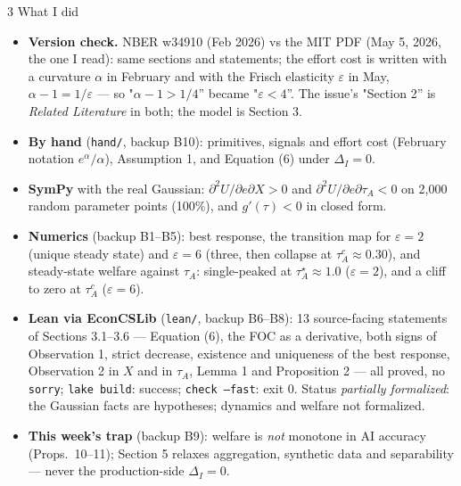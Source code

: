 \documentclass[aspectratio=169,11pt]{beamer}
\begin{document}
\begin{frame}{3 \textperiodcentered{} What I did}
  \footnotesize
  \begin{itemize}
    \item \textbf{Version check.} NBER w34910 (Feb 2026) vs the MIT PDF (May 5, 2026, the one I read): same
      sections and statements; the effort cost is written with a curvature $\alpha$ in February and with the
      Frisch elasticity $\varepsilon$ in May, $\alpha-1=1/\varepsilon$ --- so "$\alpha-1>1/4$'' became "$\varepsilon<4$''.
      The issue's "Section 2'' is \emph{Related Literature} in both; the model is Section 3.
    \item \textbf{By hand} (\texttt{hand/}, backup B10): primitives, signals and effort cost (February notation
      $e^\alpha/\alpha$), Assumption 1, and Equation (6) under $\Delta_I=0$.
    \item \textbf{SymPy} with the real Gaussian: $\partial^2U/\partial e\partial X>0$ and $\partial^2U/\partial e\partial\tau_A<0$
      on 2{,}000 random parameter points (100\%), and $g'(\tau)<0$ in closed form.
    \item \textbf{Numerics} (backup B1--B5): best response, the transition map for $\varepsilon=2$ (unique steady
      state) and $\varepsilon=6$ (three, then collapse at $\tau_A^c\approx 0.30$), and steady-state welfare
      against $\tau_A$: single-peaked at $\tau_A^\star\approx 1.0$ ($\varepsilon=2$), and a cliff to zero at
      $\tau_A^c$ ($\varepsilon=6$).
    \item \textbf{Lean via EconCSLib} (\texttt{lean/}, backup B6--B8): 13 source-facing statements of Sections
      3.1--3.6 --- Equation (6), the FOC as a derivative, both signs of Observation 1, strict decrease,
      existence and uniqueness of the best response, Observation 2 in $X$ and in $\tau_A$, Lemma 1 and
      Proposition 2 --- all proved, no \texttt{sorry}; \texttt{lake build}: success; \texttt{check --fast}: exit 0.
      Status \emph{partially formalized}: the Gaussian facts are hypotheses; dynamics and welfare not formalized.
    \item \textbf{This week's trap} (backup B9): welfare is \emph{not} monotone in AI accuracy (Props.\ 10--11);
      Section 5 relaxes aggregation, synthetic data and separability --- never the production-side $\Delta_I=0$.
  \end{itemize}
\end{frame}
\end{document}
